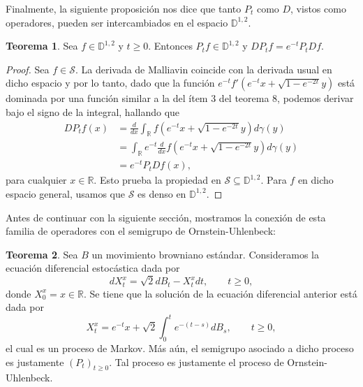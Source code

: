 \documentclass[letterpaper,twoside,12pt]{book}
\newcommand{\R}{\mathbb{R}}
\newcommand{\D}{\mathbb{D}}
\renewcommand{\S}{\mathcal{S}}
\newcommand{\1}{\mathds{1}}
\theoremstyle{definition}
\theoremstyle{definition}
\newtheorem{teo}{Teorema}
\theoremstyle{remark}
\theoremstyle{definition}
\theoremstyle{definition}
\theoremstyle{definition}
\theoremstyle{definition}
\theoremstyle{definition}
\begin{document}
Finalmente, la siguiente proposición nos dice que tanto $P_t$ como $D$, vistos como operadores, pueden ser intercambiados en el espacio $\mathbb{D}^{1,2}$.
\begin{teo} 
 Sea $f\in \D^{1,2}$ y $t\geq0$. Entonces $P_tf\in \D^{1,2}$ y $DP_tf=e^{-t}P_tDf$.
 \end{teo}
 \begin{proof} 
   Sea $f\in \S$. La derivada de Malliavin coincide con la derivada usual en dicho espacio y por lo tanto, dado que la función $e^{-t}f' \left(e^{-t}x+\sqrt{1-e^{-2t}}y\right)$ está dominada por una función similar a la del ítem 3 del teorema 8, podemos derivar bajo el signo de la integral, hallando que
   \begin{align*}
       DP_tf(x)&=\frac{d}{dx}\int_\R f \left(e^{-t}x+\sqrt{1-e^{-2t}}y\right)d\gamma(y)\\
       &=\int_\R e^{-t}\frac{d}{dx}f\left(e^{-t}x+\sqrt{1-e^{-2t}}y\right)d\gamma(y)\\
       &=e^{-t}P_t Df(x),
   \end{align*}
   para cualquier $x\in \R$. Esto prueba la propiedad en $\S\subseteq \D^{1,2}$. Para $f$ en dicho espacio general, usamos que $\S$ es denso en $\D^{1,2}$.
  \end{proof}
  Antes de continuar con la siguiente sección, mostramos la conexión de esta familia de operadores con el semigrupo de Ornstein-Uhlenbeck:
  \begin{teo} 
   Sea $B$ un movimiento browniano estándar. Consideramos la ecuación diferencial estocástica dada por 
   \[
   dX_t^{x}=\sqrt{2}dB_t-X^{x}_tdt, \qquad t\geq0,
   \]
   donde $X^{x}_0=x\in \R$. Se tiene que la solución de la ecuación diferencial anterior está dada por 
   \[
   X_t^x=e^{-t}x+\sqrt{2}\int_0^te^{-(t-s)}dB_s, \qquad t\geq0,
   \]
   el cual es un proceso de Markov. Más aún, el semigrupo asociado a dicho proceso es justamente $(P_t)_{t\geq0}$. Tal proceso es justamente el proceso de Ornstein-Uhlenbeck.
  \end{teo}
\end{document}
